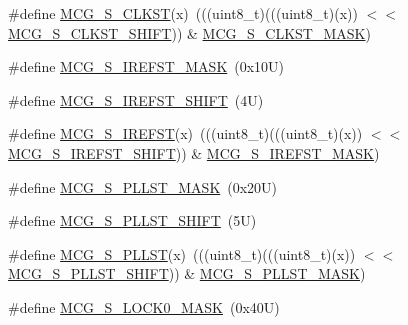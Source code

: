 \begin{DoxyCompactItemize}
\#define \mbox{\hyperlink{group___m_c_g___register___masks_ga891e8f2d733bebc7ab21cf49e0473b24}{M\+C\+G\+\_\+\+S\+\_\+\+C\+L\+K\+ST}}(x)~(((uint8\+\_\+t)(((uint8\+\_\+t)(x)) $<$$<$ \mbox{\hyperlink{group___m_c_g___register___masks_gab0768a667adb2dc2e1fb7972f9fd85a4}{M\+C\+G\+\_\+\+S\+\_\+\+C\+L\+K\+S\+T\+\_\+\+S\+H\+I\+FT}})) \& \mbox{\hyperlink{group___m_c_g___register___masks_gaf43507c78cdda211a04b5ae0509edb2e}{M\+C\+G\+\_\+\+S\+\_\+\+C\+L\+K\+S\+T\+\_\+\+M\+A\+SK}})
\item 
\#define \mbox{\hyperlink{group___m_c_g___register___masks_ga5bf822a90d9c1e67d5297420157e1dd0}{M\+C\+G\+\_\+\+S\+\_\+\+I\+R\+E\+F\+S\+T\+\_\+\+M\+A\+SK}}~(0x10\+U)
\item 
\#define \mbox{\hyperlink{group___m_c_g___register___masks_ga4a2727883c339845e709dacc0c2fd71a}{M\+C\+G\+\_\+\+S\+\_\+\+I\+R\+E\+F\+S\+T\+\_\+\+S\+H\+I\+FT}}~(4\+U)
\item 
\#define \mbox{\hyperlink{group___m_c_g___register___masks_gac86daa0998b4659fc37cb083d61a3171}{M\+C\+G\+\_\+\+S\+\_\+\+I\+R\+E\+F\+ST}}(x)~(((uint8\+\_\+t)(((uint8\+\_\+t)(x)) $<$$<$ \mbox{\hyperlink{group___m_c_g___register___masks_ga4a2727883c339845e709dacc0c2fd71a}{M\+C\+G\+\_\+\+S\+\_\+\+I\+R\+E\+F\+S\+T\+\_\+\+S\+H\+I\+FT}})) \& \mbox{\hyperlink{group___m_c_g___register___masks_ga5bf822a90d9c1e67d5297420157e1dd0}{M\+C\+G\+\_\+\+S\+\_\+\+I\+R\+E\+F\+S\+T\+\_\+\+M\+A\+SK}})
\item 
\#define \mbox{\hyperlink{group___m_c_g___register___masks_ga6f176d95968a5b7b1af67ae81734c854}{M\+C\+G\+\_\+\+S\+\_\+\+P\+L\+L\+S\+T\+\_\+\+M\+A\+SK}}~(0x20\+U)
\item 
\#define \mbox{\hyperlink{group___m_c_g___register___masks_gafddddab311f8f0cb58e7b7941f6d9a8d}{M\+C\+G\+\_\+\+S\+\_\+\+P\+L\+L\+S\+T\+\_\+\+S\+H\+I\+FT}}~(5\+U)
\item 
\#define \mbox{\hyperlink{group___m_c_g___register___masks_ga58d3f6ca3f2ccd588d0751b02c6dd0ab}{M\+C\+G\+\_\+\+S\+\_\+\+P\+L\+L\+ST}}(x)~(((uint8\+\_\+t)(((uint8\+\_\+t)(x)) $<$$<$ \mbox{\hyperlink{group___m_c_g___register___masks_gafddddab311f8f0cb58e7b7941f6d9a8d}{M\+C\+G\+\_\+\+S\+\_\+\+P\+L\+L\+S\+T\+\_\+\+S\+H\+I\+FT}})) \& \mbox{\hyperlink{group___m_c_g___register___masks_ga6f176d95968a5b7b1af67ae81734c854}{M\+C\+G\+\_\+\+S\+\_\+\+P\+L\+L\+S\+T\+\_\+\+M\+A\+SK}})
\item 
\#define \mbox{\hyperlink{group___m_c_g___register___masks_ga6cb486757d45c5211baa3b130e720b97}{M\+C\+G\+\_\+\+S\+\_\+\+L\+O\+C\+K0\+\_\+\+M\+A\+SK}}~(0x40\+U)
\item 
$$
\end{DoxyCompactItemize}
